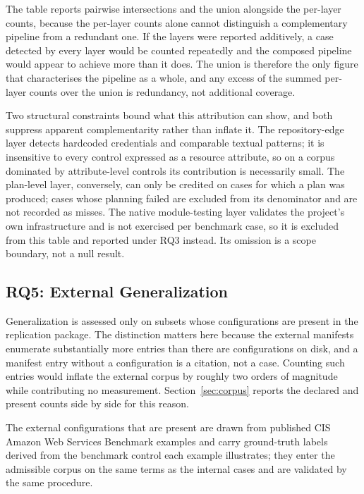 \documentclass[journal]{IEEEtran}
\begin{document}
The table reports pairwise intersections and the union alongside the per-layer
counts, because the per-layer counts alone cannot distinguish a complementary
pipeline from a redundant one. If the layers were reported additively, a case
detected by every layer would be counted repeatedly and the composed pipeline
would appear to achieve more than it does. The union is therefore the only figure
that characterises the pipeline as a whole, and any excess of the summed
per-layer counts over the union is redundancy, not additional coverage.

Two structural constraints bound what this attribution can show, and both
suppress apparent complementarity rather than inflate it. The repository-edge
layer detects hardcoded credentials and comparable textual patterns; it is
insensitive to every control expressed as a resource attribute, so on a corpus
dominated by attribute-level controls its contribution is necessarily small.
The plan-level layer, conversely, can only be credited on cases for which a plan
was produced; cases whose planning failed are excluded from its denominator
and are not recorded as misses. The native module-testing layer validates the
project's own infrastructure and is not exercised per benchmark case, so it is
excluded from this table and reported under RQ3 instead. Its omission is a scope
boundary, not a null result.

\subsection{RQ5: External Generalization}

Generalization is assessed only on subsets whose configurations are present in
the replication package. The distinction matters here because the external
manifests enumerate substantially more entries than there are configurations on
disk, and a manifest entry without a configuration is a citation, not a case.
Counting such entries would inflate the external corpus by roughly two orders of
magnitude while contributing no measurement. Section~\ref{sec:corpus} reports the
declared and present counts side by side for this reason.

The external configurations that are present are drawn from published CIS
Amazon Web Services Benchmark examples and carry ground-truth labels derived from
the benchmark control each example illustrates; they enter the admissible corpus
on the same terms as the internal cases and are validated by the same procedure.
\end{document}
